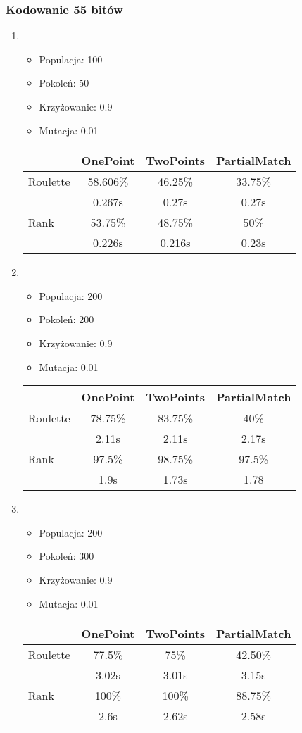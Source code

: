 \documentclass[a4paper,12pkt]{article}
\begin{document}
\subsubsection{Kodowanie 55 bitów}
\begin{enumerate}
\item
\begin{itemize}
\item Populacja: 100
\item Pokoleń: 50
\item Krzyżowanie: 0.9
\item Mutacja: 0.01
\end{itemize}
\begin{tabular}{l|c|c|c}
&OnePoint&TwoPoints&PartialMatch\\ \hline
Roulette&58.606\%&46.25\%&33.75\%	\\
&0.267s&0.27s&0.27s\\ \hline
Rank&53.75\%&48.75\%&50\%\\
&0.226s&0.216s&0.23s\\ \hline
\end{tabular}
\item
\begin{itemize}
\item Populacja: 200
\item Pokoleń: 200
\item Krzyżowanie: 0.9
\item Mutacja: 0.01
\end{itemize}
\begin{tabular}{l|c|c|c}
&OnePoint&TwoPoints&PartialMatch\\ \hline
Roulette&78.75\%&83.75\%&40\%\\
&2.11s&2.11s&2.17s\\ \hline
Rank&97.5\%&98.75\%&97.5\% \\
&1.9s&1.73s&1.78\\ \hline
\end{tabular}
\item
\begin{itemize}
\item Populacja: 200
\item Pokoleń: 300
\item Krzyżowanie: 0.9
\item Mutacja: 0.01
\end{itemize}
\begin{tabular}{l|c|c|c}
&OnePoint&TwoPoints&PartialMatch\\ \hline
Roulette&77.5\%&75\%&42.50\%\\
&3.02s&3.01s&3.15s\\ \hline
Rank&100\%&100\%&88.75\%\\
&2.6s&2.62s&2.58s\\ \hline
\end{tabular}
\end{enumerate}
\end{document}
